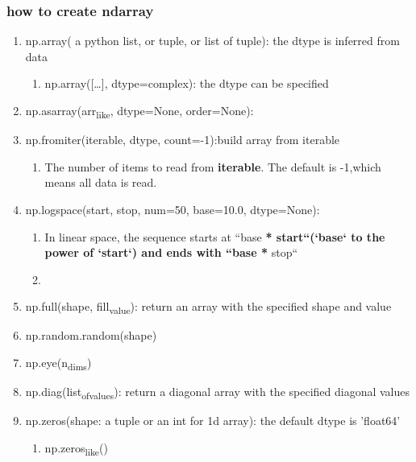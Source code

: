 \documentclass[11pt]{article}
\begin{document}
\subsubsection{how to create ndarray}
\label{sec:org79b7f33}
\begin{enumerate}
\item np.array( a python list, or tuple, or list of tuple): the dtype is inferred from data
\label{sec:org3aedcad}
\begin{enumerate}
\item np.array([\ldots{}], dtype=complex): the dtype can be specified
\label{sec:org25b896d}
\end{enumerate}
\item np.asarray(arr\textsubscript{like}, dtype=None, order=None):
\label{sec:org777774e}
\item np.fromiter(iterable, dtype, count=-1):build array from iterable
\label{sec:org7abcdfe}
\begin{enumerate}
\item The number of items to read from \textbf{iterable}.  The default is -1,which means all data is read.
\label{sec:org0996471}
\end{enumerate}
\item np.logspace(start, stop, num=50, base=10.0, dtype=None):
\label{sec:org228a2a9}
\begin{enumerate}
\item In linear space, the sequence starts at ``base \textbf{* start``(`base` to the power of `start`) and ends with ``base *} stop``
\label{sec:orgbb7f871}
\item 
\label{sec:org78abe58}
\end{enumerate}
\item np.full(shape, fill\textsubscript{value}): return an array with the specified shape and value
\label{sec:org23139ee}
\item np.random.random(shape)
\label{sec:org88af4cd}
\item np.eye(n\textsubscript{dims})
\label{sec:org17d308d}
\item np.diag(list\textsubscript{of}\textsubscript{values}): return a diagonal array with the specified diagonal values
\label{sec:orgd9819ad}
\item np.zeros(shape: a tuple or an int for 1d array): the default dtype is 'float64'
\label{sec:orgb99c6b8}
\begin{enumerate}
\item np.zeros\textsubscript{like}()
\label{sec:org7660198}
\end{enumerate}

\end{enumerate}
\end{document}
